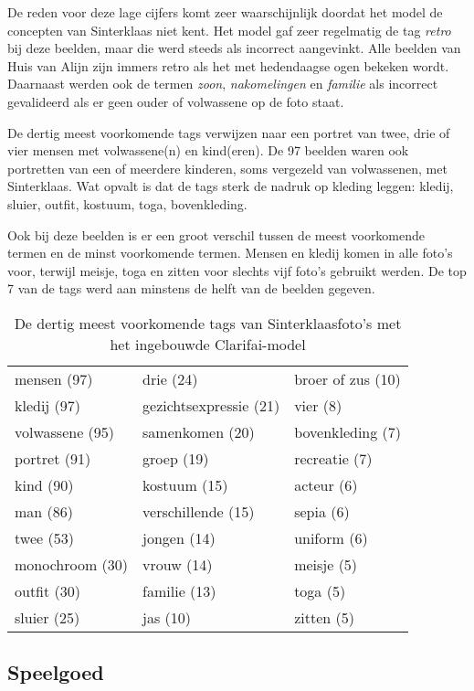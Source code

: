 De reden voor deze lage cijfers komt zeer waarschijnlijk doordat het model de concepten van Sinterklaas niet kent. Het model gaf zeer regelmatig de tag \textit{retro} bij deze beelden, maar die werd steeds als incorrect aangevinkt. Alle beelden van Huis van Alijn zijn immers retro als het met hedendaagse ogen bekeken wordt. Daarnaast werden ook de termen \textit{zoon}, \textit{nakomelingen} en \textit{familie} als incorrect gevalideerd als er geen ouder of volwassene op de foto staat. 

De dertig meest voorkomende tags verwijzen naar een portret van twee, drie of vier mensen met volwassene(n) en kind(eren). De 97 beelden waren ook portretten van een of meerdere kinderen, soms vergezeld van volwassenen, met Sinterklaas. Wat opvalt is dat de tags sterk de nadruk op kleding leggen: kledij, sluier, outfit, kostuum, toga, bovenkleding. 

Ook bij deze beelden is er een groot verschil tussen de meest voorkomende termen en de minst voorkomende termen. Mensen en kledij komen in alle foto’s voor, terwijl meisje, toga en zitten voor slechts vijf foto’s gebruikt werden. De top 7 van de tags werd aan minstens de helft van de beelden gegeven. 

\begin{table}
	\centering
	\begin{tabular}{*{3}{l}}
		mensen (97) & drie (24) & broer of zus (10) \\
		kledij (97) & gezichtsexpressie (21) & vier (8) \\
		volwassene (95) & samenkomen (20) & bovenkleding (7) \\
		portret (91) & groep (19) & recreatie (7) \\
		kind (90) & kostuum (15) & acteur (6) \\
		man (86) & verschillende (15) & sepia (6) \\
		twee (53) & jongen (14) & uniform (6) \\
		monochroom (30) & vrouw (14) & meisje (5) \\
		outfit (30) & familie (13) & toga (5) \\
		sluier (25) & jas (10) & zitten (5) \\
	\end{tabular}
	\caption{De dertig meest voorkomende tags van Sinterklaasfoto's met het ingebouwde Clarifai-model}
	\label{tab:30-termen-sint}
\end{table}

\subsection{Speelgoed}

